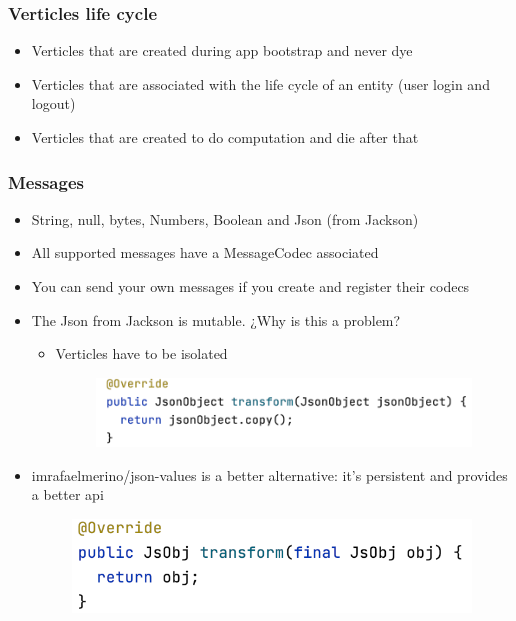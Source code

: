 \documentclass{beamer}
\begin{document}
\begin{frame}
\frametitle{Verticles life cycle}
\begin{itemize}
\item<1-> Verticles that are created during app bootstrap and never dye
\item<2-> Verticles that are associated with the life cycle of an entity (user login and logout)
\item<3-> Verticles that  are created to do computation and die after that
\end{itemize}
\end{frame}

\begin{frame}
\frametitle{Messages}
\begin{itemize}
\item<1-> String, null, bytes, Numbers, Boolean and Json (from Jackson)
\item<2-> All supported messages have a MessageCodec associated
\item<3-> You can send your own messages if you create and register their codecs
\item<4-> The Json from Jackson is mutable. ¿Why is this a problem?
\begin{itemize}
\item<5-> Verticles have to be isolated
\newline
\begin{figure}
\includegraphics[scale=0.5]{images/vertx-json-codec.png}
\end{figure}
\end{itemize}
\item<6->  imrafaelmerino/json-values is a better alternative: it's persistent and provides a better api
\newline
\begin{figure}
\includegraphics[scale=0.5]{images/jsvalues-codec.png}
\end{figure}
\end{itemize}
\end{frame}
\end{document}
